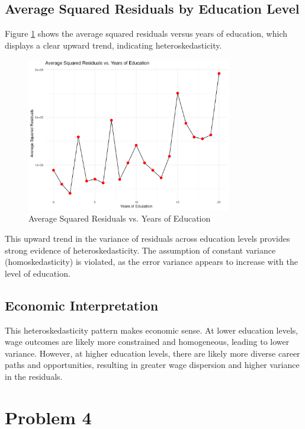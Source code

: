 \documentclass[12pt]{article}
\begin{document}
\subsection{Average Squared Residuals by Education Level}

Figure \ref{fig:avg_squared_residuals_vs_educ} shows the average squared residuals versus years of education, which displays a clear upward trend, indicating heteroskedasticity.

\begin{figure}[h]
    \centering
    \includegraphics[width=0.8\textwidth]{output/avg_squared_residuals_vs_educ.png}
    \caption{\label{fig:avg_squared_residuals_vs_educ}Average Squared Residuals vs. Years of Education}
\end{figure}

This upward trend in the variance of residuals across education levels provides strong evidence of heteroskedasticity. The assumption of constant variance (homoskedasticity) is violated, as the error variance appears to increase with the level of education.

\subsection{Economic Interpretation}

This heteroskedasticity pattern makes economic sense. At lower education levels, wage outcomes are likely more constrained and homogeneous, leading to lower variance. However, at higher education levels, there are likely more diverse career paths and opportunities, resulting in greater wage dispersion and higher variance in the residuals.

\section{Problem 4}
\end{document}
